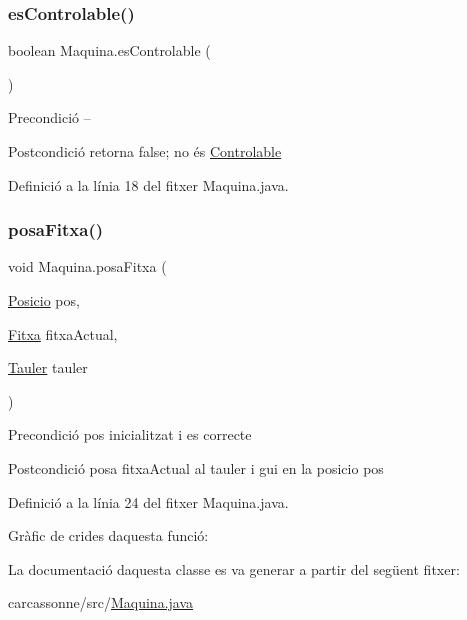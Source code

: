 \subsubsection{\texorpdfstring{es\+Controlable()}{esControlable()}}
{\footnotesize\ttfamily boolean Maquina.\+es\+Controlable (\begin{DoxyParamCaption}{ }\end{DoxyParamCaption})}

\begin{DoxyPrecond}{Precondició}
-- 
\end{DoxyPrecond}
\begin{DoxyPostcond}{Postcondició}
retorna false; no és \mbox{\hyperlink{class_controlable}{Controlable}} 
\end{DoxyPostcond}


Definició a la línia 18 del fitxer Maquina.\+java.

\mbox{\label{class_maquina_a2e26c9f440fdf09879e0c8434dd02e35}} 
\subsubsection{\texorpdfstring{posa\+Fitxa()}{posaFitxa()}}
{\footnotesize\ttfamily void Maquina.\+posa\+Fitxa (\begin{DoxyParamCaption}\item[{\mbox{\hyperlink{class_posicio}{Posicio}}}]{pos,  }\item[{\mbox{\hyperlink{class_fitxa}{Fitxa}}}]{fitxa\+Actual,  }\item[{\mbox{\hyperlink{class_tauler}{Tauler}}}]{tauler }\end{DoxyParamCaption})}

\begin{DoxyPrecond}{Precondició}
pos inicialitzat i es correcte 
\end{DoxyPrecond}
\begin{DoxyPostcond}{Postcondició}
posa fitxa\+Actual al tauler i gui en la posicio pos 
\end{DoxyPostcond}


Definició a la línia 24 del fitxer Maquina.\+java.

Gràfic de crides d\textquotesingle{}aquesta funció\+:


La documentació d\textquotesingle{}aquesta classe es va generar a partir del següent fitxer\+:\begin{DoxyCompactItemize}
\item 
carcassonne/src/\mbox{\hyperlink{_maquina_8java}{Maquina.\+java}}\end{DoxyCompactItemize}
